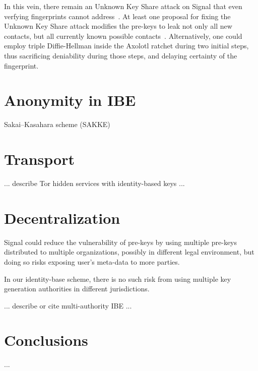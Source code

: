 \documentclass[twoside,letterpaper]{sig-alternate}
\begin{document}
In this vein, there remain an Unknown Key Share attack on Signal that
even verfying fingerprints cannot address~\cite[\S4.2]{TextSecure}.
At least one proposal for fixing the Unknown Key Share attack
modifies the pre-keys to leak not only all new contacts, but
all currently known possible contacts~\cite[\S4.3]{TextSecure}. 
%
Alternatively, one could employ triple Diffie-Hellman inside the
Axolotl ratchet during two initial steps,
 thus sacrificing deniability during those steps,
 and delaying certainty of the fingerprint. 


\section{Anonymity in IBE}


Sakai–Kasahara scheme (SAKKE)



\section{Transport}

... describe Tor hidden services with identity-based keys ...

\section{Decentralization}

Signal could reduce the vulnerability of pre-keys by using
multiple pre-keys distributed to multiple organizations,
 possibly in different legal environment, but
doing so risks exposing user's meta-data to more parties.

In our identity-base scheme, there is no such risk from using
multiple key generation authorities in different jurisdictions.

... describe or cite multi-authority IBE ...

\section{Conclusions}

...







\end{document}
